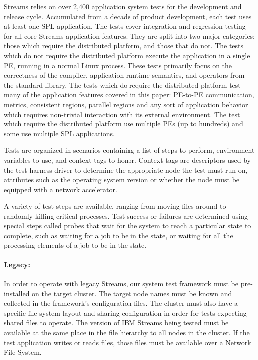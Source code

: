 Streams relies on over 2,400 application system tests for the development and
release cycle. Accumulated from a decade of product development, each test uses
at least one SPL application. The tests cover integration and regression testing
for all core Streams application features. They are split into two major
categories: those which require the distributed platform, and those that do not.
The tests which do not require the distributed platform execute the application
in a single PE, running in a normal Linux process. These tests primarily focus
on the correctness of the compiler, application runtime semantics, and operators
from the standard library. The tests which do require the distributed platform
test many of the application features covered in this paper: PE-to-PE
communication, metrics, consistent regions, parallel regions and any sort of
application behavior which requires non-trivial interaction with its external
environment. The test which require the distributed platform use multiple PEs (up 
to hundreds) and some use multiple SPL applications.

Tests are organized in scenarios containing a list of steps to perform,
environment variables to use, and context tags to honor. Context tags are
descriptors used by the test harness driver to determine the appropriate node
the test must run on, attributes such as the operating system version or whether
the node must be equipped with a network accelerator.

A variety of test steps are available, ranging from moving files around to
randomly killing critical processes. Test success or failures are determined
using special steps called probes that wait for the system to reach a particular
state to complete, such as waiting for a job to be in the 
state, or waiting for all the processing elements of a job to be in the
 state.

\paragraph{Legacy:} In order to operate with legacy Streams, our system test
framework must be pre-installed on the target cluster. The target node names
must be known and collected in the framework's configuration files. The cluster
must also have a specific file system layout and sharing configuration in order
for tests expecting shared files to operate. The version of IBM Streams
being tested must be available at the same place in the file hierarchy to all
nodes in the cluster. If the test application writes or reads files, those 
files must be available over a Network File System.

